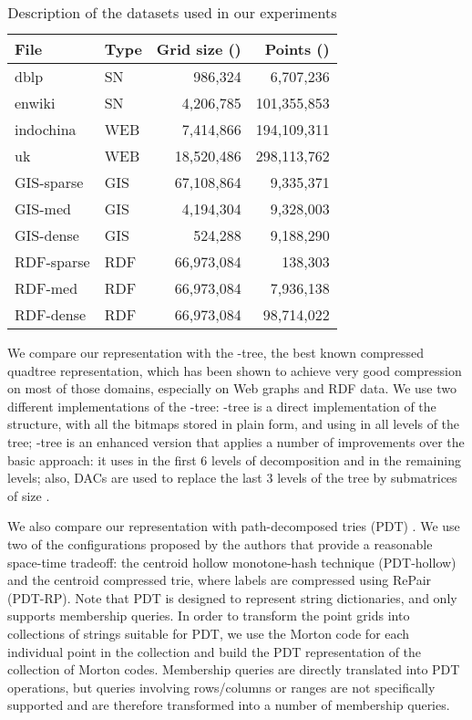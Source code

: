 \documentclass{elsarticle}
\newcommand{\kt}{-tree\xspace}
\newcommand{\ktplain}{-tree\xspace}
\newcommand{\ktdac}{-tree\xspace}
\newcommand{\dblp}{\textsf{dblp}\xspace}
\newcommand{\enwiki}{\textsf{enwiki}\xspace}
\newcommand{\indo}{\textsf{indochina}\xspace}
\newcommand{\uk}{\textsf{uk}\xspace}
\newcommand{\giss}{\textsf{GIS-sparse}\xspace}
\newcommand{\gism}{\textsf{GIS-med}\xspace}
\newcommand{\gisd}{\textsf{GIS-dense}\xspace}
\newcommand{\rdfs}{\textsf{RDF-sparse}\xspace}
\newcommand{\rdfm}{\textsf{RDF-med}\xspace}
\newcommand{\rdfd}{\textsf{RDF-dense}\xspace}
\newcommand{\pdt}{PDT\xspace}
\newcommand{\pdth}{PDT-hollow\xspace}
\newcommand{\pdtrp}{PDT-RP\xspace}
\begin{document}
\begin{table}
\centering

\begin{tabular}{ l | l | r r }
 File  & Type & Grid size () & Points () \\
 \hline
\dblp       & SN  &     986,324 &   6,707,236 \\
\enwiki     & SN  &   4,206,785 & 101,355,853 \\
\hline
\indo  & WEB &   7,414,866 & 194,109,311 \\
\uk         & WEB &  18,520,486 & 298,113,762 \\
\hline
\giss   & GIS &  67,108,864 &   9,335,371 \\
\gism      & GIS &   4,194,304 &   9,328,003 \\
\gisd    & GIS &     524,288 &   9,188,290 \\
\hline
\rdfs  & RDF &  66,973,084 &     138,303 \\
\rdfm   & RDF &  66,973,084 &   7,936,138 \\
\rdfd   & RDF &  66,973,084 &  98,714,022 \\
\hline
\end{tabular}
\caption{Description of the datasets used in our experiments}
\label{tab:datasets}
\end{table}

We compare our representation with the \kt \cite{BLN14}, the best known compressed quadtree representation, which has been shown to achieve very good compression on most of those domains, especially on Web graphs and RDF data. We use two different implementations of the \kt: \ktplain is a direct implementation of the structure, with all the bitmaps stored in plain form, and using  in all levels of the tree; \ktdac is an enhanced version that applies a number of improvements over the basic approach: it uses  in the first 6 levels of decomposition and  in the remaining levels; also, DACs are used to replace the last 3 levels of the tree by submatrices of size .

We also compare our representation with path-decomposed tries (\pdt) \cite{GO14}. We use two of the configurations proposed by the authors that provide a reasonable space-time tradeoff: the centroid hollow monotone-hash technique (\pdth) and the centroid compressed trie, where labels are compressed using RePair (\pdtrp). Note that \pdt is designed to represent string dictionaries, and only supports membership queries. In order to transform the point grids into collections of strings suitable for \pdt, we use the Morton code for each individual point in the collection and build the \pdt representation of the collection of Morton codes. Membership queries are directly translated into \pdt operations, but queries involving rows/columns or ranges are not specifically supported and are therefore transformed into a number of membership queries.
\end{document}
